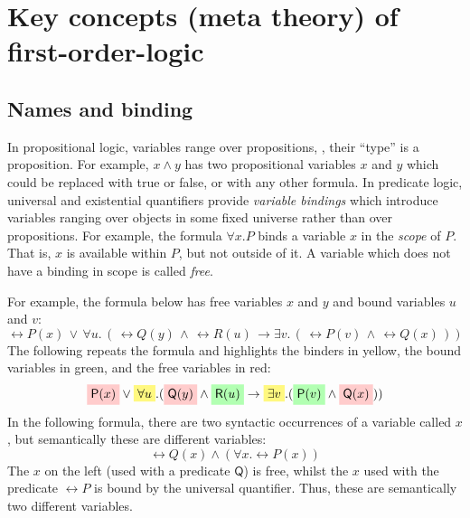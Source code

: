 \section{Key concepts (meta theory) of first-order-logic}

\subsection{Names and binding}

In propositional logic, variables range over propositions, \ie{},
their ``type'' is a proposition. For example, $x \wedge y$ has two
propositional variables $x$ and $y$ which could be replaced with true
or false, or with any other formula. In predicate logic, universal and
existential quantifiers provide \emph{variable bindings} which
introduce variables ranging over objects in some fixed universe rather than
over propositions. For example, the formula $\forall x . P$ binds
a variable $x$ in the \emph{scope} of $P$. That is, $x$
is available within $P$, but not outside of it. A variable which does
not have a binding in scope is called \emph{free}.

For example, the formula below has free variables $x$ and $y$
and bound variables $u$ and $v$:
%
\begin{equation*}
\rel{P}(x) \, \vee  \, \forall u . \, (\, \rel{Q}(y) \, \wedge \,
\rel{R}(u) \, \rightarrow \exists v . \, (\, \rel{P}(v) \, \wedge \, \rel{Q}(x) \,))
\end{equation*}
%
The following repeats the formula and
highlights the binders in yellow, the bound variables
in green, and the free variables in red:
%
\begin{equation*}
\highlightR{\rel{P}(x)} \vee \highlight{\forall u} . (\highlightR{\rel{Q}(y)} \wedge \highlightG{\rel{R}(u)}
\rightarrow \highlight{\exists v} .
(\highlightG{\rel{P}(v)} \wedge \highlightR{\rel{Q}(x)}))
\end{equation*}
%
%
In the following formula, there are two syntactic occurrences of a
variable called $x$, but semantically these are different variables:
%
\begin{equation*}
\rel{Q}(x) \wedge (\forall x . \rel{P}(x))
\end{equation*}
%
The $x$ on the left (used with a predicate $\mathsf{Q}$) is free,
whilst the $x$ used with the predicate $\rel{P}$ is bound by the
universal quantifier. Thus, these are semantically two different
variables.

